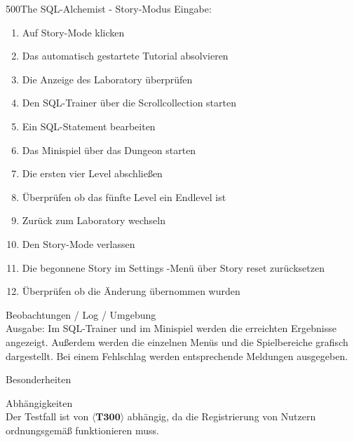 \begin{testcase}{500}{The SQL-Alchemist - Story-Modus}
Eingabe:
\begin{enumerate}
\item Auf \glqq Story-Mode \grqq klicken
\item Das automatisch gestartete Tutorial absolvieren
\item Die Anzeige des \glqq Laboratory \grqq überprüfen
\item Den SQL-Trainer über die \glqq Scrollcollection \grqq starten
\item Ein SQL-Statement bearbeiten
\item Das Minispiel über das \glqq Dungeon \grqq starten
\item Die ersten vier Level abschließen
\item Überprüfen ob das fünfte Level ein \glqq Endlevel \grqq ist
\item Zurück zum \glqq Laboratory \grqq wechseln
\item Den \glqq Story-Mode \grqq verlassen
\item Die begonnene Story im \glqq Settings \grqq-Menü über \glqq Story reset \grqq zurücksetzen 
\item Überprüfen ob die Änderung übernommen wurden
\end{enumerate}

\item[Beobachtungen / Log / Umgebung]~\\
Ausgabe:
Im SQL-Trainer und im Minispiel werden die erreichten Ergebnisse angezeigt. Außerdem werden die einzelnen Menüs und die Spielbereiche grafisch dargestellt. Bei einem Fehlschlag werden entsprechende Meldungen ausgegeben.

\item[Besonderheiten]~\\

\item[Abhängigkeiten]~\\
Der Testfall ist von $\langle\textbf{T300}\rangle$ abhängig, da die Registrierung von Nutzern ordnungsgemäß funktionieren muss.

\end{testcase}

